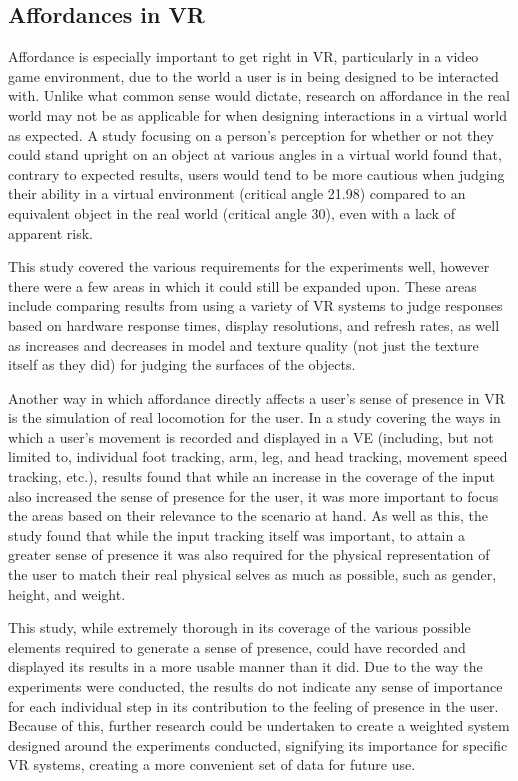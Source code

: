 		\subsection{Affordances in VR}
		\label{lr:vr:affordances}
			Affordance is especially important to get right in VR, particularly in a video game environment, due to the world a user is in being designed to be interacted with.
			Unlike what common sense would dictate, research on affordance in the real world may not be as applicable for when designing interactions in a virtual world as expected.
			A study \cite{Regia-Corte2012} focusing on a person's perception for whether or not they could stand upright on an object at various angles in a virtual world found that, contrary to expected results, users would tend to be more cautious when judging their ability in a virtual environment (critical angle 21.98\degree) compared to an equivalent object in the real world (critical angle 30\degree), even with a lack of apparent risk.

			This study covered the various requirements for the experiments well, however there were a few areas in which it could still be expanded upon.
			These areas include comparing results from using a variety of VR systems to judge responses based on hardware response times, display resolutions, and refresh rates, as well as increases and decreases in model and texture quality (not just the texture itself as they did) for judging the surfaces of the objects.

			Another way in which affordance directly affects a user's sense of presence in VR is the simulation of real locomotion for the user.
			In a study \cite{Turchet2015} covering the ways in which a user's movement is recorded and displayed in a VE (including, but not limited to, individual foot tracking, arm, leg, and head tracking, movement speed tracking, etc.), results found that while an increase in the coverage of the input also increased the sense of presence for the user, it was more important to focus the areas based on their relevance to the scenario at hand.
			As well as this, the study found that while the input tracking itself was important, to attain a greater sense of presence it was also required for the physical representation of the user to match their real physical selves as much as possible, such as gender, height, and weight.

			This study, while extremely thorough in its coverage of the various possible elements required to generate a sense of presence, could have recorded and displayed its results in a more usable manner than it did.
			Due to the way the experiments were conducted, the results do not indicate any sense of importance for each individual step in its contribution to the feeling of presence in the user.
			Because of this, further research could be undertaken to create a weighted system designed around the experiments conducted, signifying its importance for specific VR systems, creating a more convenient set of data for future use.

